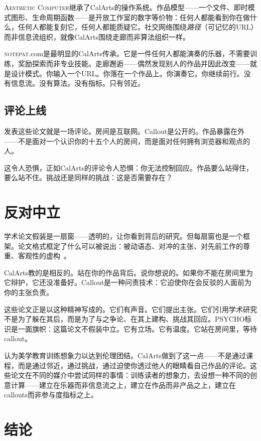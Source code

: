 \documentclass[10pt,letterpaper,twocolumn]{article}
\newcommand{\ac}{\textsc{Aesthetic Computer}}
\newcommand{\np}{\textsc{notepat}}
\begin{document}
\ac{}继承了CalArts的操作系统。作品模型——一个文件、即时模式图形、生命周期函数——是开放工作室的数字等价物：任何人都能看到你在做什么，任何人都能复刻它，任何人都能质疑它。社交网络围绕\emph{路径}（可记忆的URL）而非信息流组织，就像CalArts围绕走廊而非算法组织一样。

\np{}.com是最明显的CalArts传承。它是一件任何人都能演奏的乐器，不需要训练，奖励探索而非专业技能。走廊邂逅——偶然发现别人的作品并因此改变——就是设计模式。你输入一个URL。你落在一个作品上。你演奏它。你继续前行。没有信息流。没有算法。没有指标。只有邻近。

\subsection{评论上线}

发表这些论文就是一场评论。房间是互联网。Callout是公开的。作品暴露在外——不是面对一个认识你的十五个人的房间，而是面对任何拥有浏览器和观点的人。

这令人恐惧，正如CalArts的评论令人恐惧：你无法控制回应。作品要么站得住，要么站不住。挑战还是同样的挑战：这是否需要存在？

\section{反对中立}

学术论文假装是一扇窗——透明的，让你看到背后的研究。但每扇窗也是一个框架。论文格式框定了什么可以被说出：被动语态、对冲的主张、对先前工作的尊重、客观性的虚构~\citep{freire1970pedagogy}。

CalArts教的是相反的。站在你的作品背后。说你想说的。如果你不能在房间里为它辩护，它还没准备好。Callout是一种问责技术：它迫使你在会反驳的人面前为你的主张负责。

这些论文正是以这种精神写成的。它们有声音。它们提出主张。它们引用学术研究不是为了躲在其后，而是为了与之争论、在其上建构、挑战其回应。PSYCHO标识是一面旗帜：这篇论文不假装中立。它有立场。它有温度。它站在房间里，等待callout。

\citet{spivak2012aesthetic}认为美学教育训练想象力以达到伦理团结。CalArts做到了这一点——不是通过课程，而是通过邻近，通过挑战，通过迫使你透过他人的眼睛看自己作品的评论。这些论文在不同的媒介中尝试同样的事情：训练读者的想象力，去设想一种不同的创意计算——建立在乐器而非信息流之上，建立在作品而非产品之上，建立在callouts而非参与度指标之上。

\section{结论}
\end{document}
